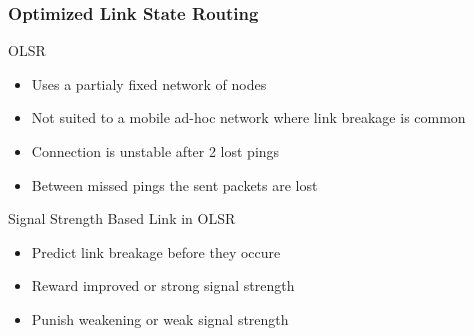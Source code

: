 \begin{frame}[t]
  \frametitle{Optimized Link State Routing}

  OLSR
  \begin{itemize}
  \item Uses a partialy fixed network of nodes
  \item Not suited to a mobile ad-hoc network where link breakage is common
  \item Connection is unstable after 2 lost pings
  \item Between missed pings the sent packets are lost
  \end{itemize}

  \vfill

  Signal Strength Based Link in OLSR
  \begin{itemize}
  \item  Predict link breakage before they occure
  \item  Reward improved or strong signal strength
  \item  Punish weakening or weak signal strength 
  \end{itemize}

  \vfill

  \begin{flushleft}
    \begin{tiny}
      \begin{minipage}{1.0\linewidth}
      \end{minipage}
    \end{tiny}
  \end{flushleft}
  
\end{frame}

